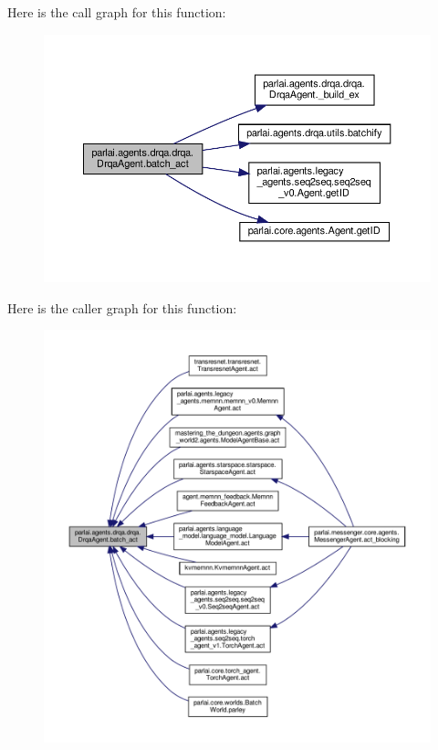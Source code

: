 Here is the call graph for this function\+:
\nopagebreak
\begin{figure}[H]
\begin{center}
\leavevmode
\includegraphics[width=350pt]{classparlai_1_1agents_1_1drqa_1_1drqa_1_1DrqaAgent_a5c2f02e9c1ddce46df0d216947227395_cgraph}
\end{center}
\end{figure}
Here is the caller graph for this function\+:
\nopagebreak
\begin{figure}[H]
\begin{center}
\leavevmode
\includegraphics[width=350pt]{classparlai_1_1agents_1_1drqa_1_1drqa_1_1DrqaAgent_a5c2f02e9c1ddce46df0d216947227395_icgraph}
\end{center}
\end{figure}
\mbox{\label{classparlai_1_1agents_1_1drqa_1_1drqa_1_1DrqaAgent_a1d925f46a6b35d1f10cb033a1184841d}} 
